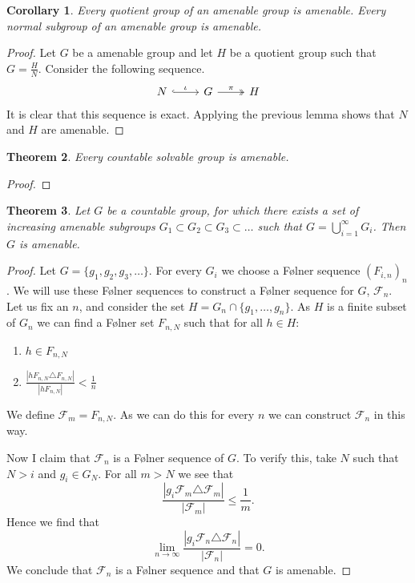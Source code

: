 \documentclass[titlepage, a4paper]{article}
\newcommand{\card}[1]{\left| #1 \right|}
\newtheorem{theorem}{Theorem}[section]
\newtheorem{corollary}[theorem]{Corollary}
\theoremstyle{remark}
\begin{document}
    \begin{corollary}\label{cor:quotient_amenable}
	    Every quotient group of an amenable group is amenable. Every normal subgroup of an amenable group is amenable. 
    \end{corollary}
    \begin{proof}
	    Let $G$ be a amenable group and let $H$ be a quotient group such that $G = \frac{H}{N}$. 
        Consider the following sequence.
        \[\begin{tikzcd}
            N \arrow[r, "\iota", hook] & G \arrow[r, "\pi", two heads] & H
        \end{tikzcd}\]
        It is clear that this sequence is exact.
	    Applying the previous lemma shows that $N$ and $H$ are amenable.
    \end{proof}
    \begin{theorem}
        Every countable solvable group is amenable. 
    \end{theorem}
    \begin{proof}
        
    \end{proof}

    \begin{theorem}\label{thm:rising_amenable}
    	Let $G$ be a countable group, for which there exists a set of increasing amenable subgroups $G_1 \subset  G_2 \subset  G_3 \subset  \ldots$ such that $G = \bigcup_{i = 1}^{\infty} G_i$. Then $G$ is amenable.  
    \end{theorem}
    \begin{proof}
    	Let $G = \{g_1, g_2, g_3, \ldots\} $. 
	For every $G_i$ we choose a Følner sequence $(F_{i, n})_n$. We will use these Følner sequences to construct a Følner sequence for $G$, $\mathcal{F}_n$.
	Let us fix an $n$, and consider the set $H = G_n \cap \{g_1, \ldots, g_n\}$. 
	As $H$ is a finite subset of $G_n$ we can find a Følner set $F_{n, N}$ such that for all $h \in H:$ 
	\begin{enumerate}
		\item $h \in F_{n, N}$
		\item $\frac{\card{hF_{n,N}\triangle F_{n,N}}}{\card{hF_{n,N}}} < \frac{1}{n} $
	\end{enumerate}
	We define $\mathcal{F}_m = F_{n,N}$.
	As we can do this for every $n$ we can construct $\mathcal{F}_n$ in this way.

	Now I claim that $\mathcal{F}_n$ is a Følner sequence of $G$. 
	To verify this, take $N$ such that $N > i$ and $g_i \in G_N$. For all $m >N$ we see that \[
		\frac{\card{g_i \mathcal{F}_m \triangle \mathcal{F}_m }}{\card{\mathcal{F}_m}} \le \frac{1}{m}
	.\] 
	Hence we find that \[
		\lim_{n \to \infty} \frac{\card{g_i \mathcal{F}_n \triangle \mathcal{F}_n }}{\card{\mathcal{F}_n}} = 0
	.\] 
	We conclude that $\mathcal{F}_n$ is a Følner sequence and that  $G$ is amenable. 
    \end{proof}
\end{document}
